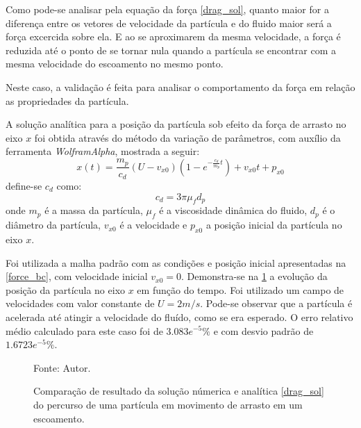 Como pode-se analisar pela equação da força \eqref{drag_sol}, quanto maior for a diferença entre os vetores de velocidade da partícula e do fluido maior será a força excercida sobre ela.
E ao se aproximarem da mesma velocidade, a força é reduzida até o ponto de se tornar nula quando a partícula se encontrar com a mesma velocidade do escoamento no mesmo ponto.

Neste caso, a validação é feita para analisar o comportamento da força em relação as propriedades da partícula.

A solução analítica para a posição da partícula sob efeito da força de arrasto no eixo $x$ foi obtida através do método da variação de parâmetros, com auxílio da ferramenta \textit{WolframAlpha}, mostrada a seguir:
\begin{equation}
    x(t) = \dfrac{m_p}{c_{d}} (U - v_{x0}) \left(1 - e^{-\frac{c_{d}}{m_p}t}\right) + v_{x0}t + p_{x0}
    \label{drag_sol} 
\end{equation}
define-se $c_{d}$ como:
\begin{equation}
    c_d = 3 \pi \mu_f d_p
    \label{drag_c} 
\end{equation}
onde $m_p$ é a massa da partícula, $\mu_f$ é a viscosidade dinâmica do fluido, $d_p$ é o diâmetro da partícula, $v_{x0}$ é a velocidade e $p_{x0}$ a posição inicial da partícula no eixo $x$.

Foi utilizada a malha padrão com as condições e posição inicial apresentadas na \ref{force_bc}, com velocidade inicial $v_{x0}=0$.
Demonstra-se na \ref{drag_comp} a evolução da posição da partícula no eixo $x$ em função do tempo.
Foi utilizado um campo de velocidades com valor constante de $U=2m/s$.
Pode-se observar que a partícula é acelerada até atingir a velocidade do fluído, como se era esperado.
O erro relativo médio calculado para este caso foi de $3.083e^{-5}\%$ e com desvio padrão de $1.6723e^{-5}\%$.
\begin{figure}[H]
    \centering
     {\raggedleft \scriptsize Fonte: Autor.}
    \caption{Comparação de resultado da solução númerica e analítica \ref{drag_sol} do percurso de uma partícula em movimento de arrasto em um escoamento.}
    \label{drag_comp}
\end{figure}

